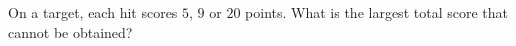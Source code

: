 On a target, each hit scores $5$, $9$ or $20$ points. What is the largest total score that cannot be obtained?
